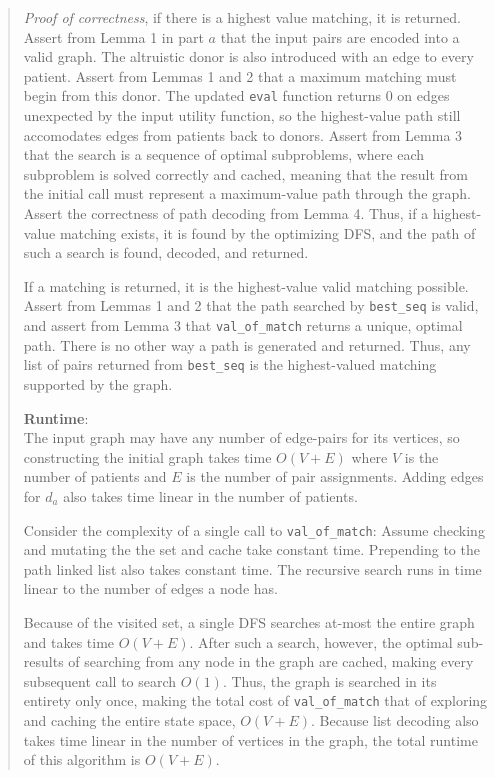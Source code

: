 \documentclass[11pt]{article}
\begin{document}
\begin{enumerate}
\begin{enumerate}
\begin{quote}
      \medskip
      \textit{Proof of correctness}, if there is a highest value matching, it is returned. Assert from Lemma 1 in part $a$ that the input pairs are encoded into a valid graph. The altruistic donor is also introduced with an edge to every patient. Assert from Lemmas 1 and 2 that a maximum matching must begin from this donor. The updated \texttt{eval} function returns $0$ on edges unexpected by the input utility function, so the highest-value path still accomodates edges from patients back to donors. Assert from Lemma 3 that the search is a sequence of optimal subproblems, where each subproblem is solved correctly and cached, meaning that the result from the initial call must represent a maximum-value path through the graph. Assert the correctness of path decoding from Lemma 4. Thus, if a highest-value matching exists, it is found by the optimizing DFS, and the path of such a search is found, decoded, and returned. 
      
      \medskip
      If a matching is returned, it is the highest-value valid matching possible. Assert from Lemmas 1 and 2 that the path searched by \texttt{best\_seq} is valid, and assert from Lemma 3 that \texttt{val\_of\_match} returns a unique, optimal path. There is no other way a path is generated and returned. Thus, any list of pairs returned from \texttt{best\_seq} is the highest-valued matching supported by the graph.

      \medskip
      \textbf{Runtime}: \\ 
      The input graph may have any number of edge-pairs for its vertices, so constructing the initial graph takes time $O(V + E)$ where $V$ is the number of patients and $E$ is the number of pair assignments. Adding edges for $d_a$ also takes time linear in the number of patients. 

      \medskip
      Consider the complexity of a single call to \texttt{val\_of\_match}: Assume checking and mutating the the set and cache take constant time. Prepending to the path linked list also takes constant time. The recursive search runs in time linear to the number of edges a node has. 

      \medskip
      Because of the visited set, a single DFS searches at-most the entire graph and takes time $O(V + E)$. After such a search, however, the optimal sub-results of searching from any node in the graph are cached, making every subsequent call to search $O(1)$. Thus, the graph is searched in its entirety only once, making the total cost of \texttt{val\_of\_match} that of exploring and caching the entire state space, $O(V  + E)$. Because list decoding also takes time linear in the number of vertices in the graph, the total runtime of this algorithm is $O(V + E)$.
      \end{quote}
\end{enumerate}
    


\end{enumerate}
\end{document}
